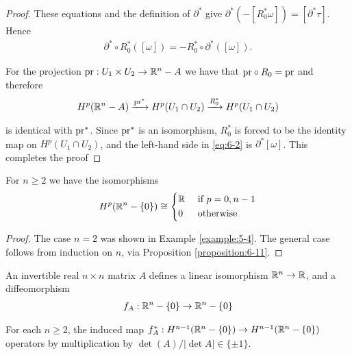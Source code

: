 \begin{proof}
These equations and the definition of $\partial^*$ give $\partial^*(-[R^*_0\omega]) = [\partial^*\tau]$. Hence 
\begin{align}\label{eq:6-2}
  \partial^*\circ R^*_0([\omega])
  = -R^*_0\circ\partial^*([\omega]).
\end{align}

For the projection $\mathrm{pr}:U_1\times U_2\to\mathbb{R}^n-A$ we have that $\mathrm{pr}\circ R_0 = \mathrm{pr}$ and therefore 
\begin{align*}
  H^p(\mathbb{R}^n-A)\xrightarrow[]{\mathrm{pr}^*}H^p(U_1\cap U_2)\xrightarrow[]{R^*_0} H^p(U_1\cap U_2)
\end{align*}

is identical with $\mathrm{pr}^*$. Since $\mathrm{pr}^*$ is an isomorphism, $R^*_0$ is forced to be the identity
map on $H^p(U_1\cap U_2)$, and the left-hand side in \eqref{eq:6-2} is $\partial^*[\omega]$. This completes the proof
\end{proof}

\begin{theorem}\label{theorem:6-13}
  For $n\ge 2$ we have the isomorphisms
  \begin{align*}
    H^p(\mathbb{R}^n -\{0\}) \cong \left\{\begin{aligned}
      & \mathbb{R} && \text{ if } p=0, n-1\\
      & 0 && \text{ otherwise}
    \end{aligned}\right.
  \end{align*}
\end{theorem}

\begin{proof}
  The case $n = 2$ was shown in Example \ref{example:5-4}. The general case follows
from induction on $n$, via Proposition \ref{proposition:6-11}.
\end{proof}


An invertible real $n\times n$ matrix $A$ defines a linear isomorphism $\mathbb{R}^n\to\mathbb{R}$, and
a diffeomorphism
\begin{align*}
  f_A: \mathbb{R}^n-\{0\}\to \mathbb{R}^n-\{0\}
\end{align*}

\begin{lemma}\label{lemma:6-14}
  For each $n\ge 2$, the induced map $f^*_A:H^{n-1}(\mathbb{R}^n - \{0\})\to H^{n-1}(\mathbb{R}^n - \{0\})$ operators by 
  multiplication by $\det(A)/|\det A|\in \{\pm 1\}$.
\end{lemma}

